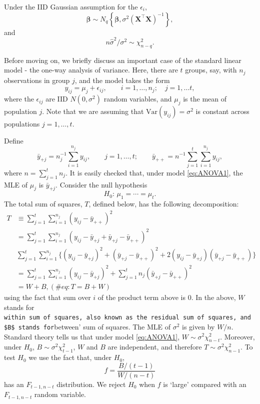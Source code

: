 \documentclass[]{book}
\theoremstyle{definition}
\theoremstyle{definition}
\theoremstyle{definition}
\theoremstyle{remark}
\begin{document}
Under the IID Gaussian assumption for the \(\epsilon_i\),
\[
\hat{\pmb \beta} \sim N_q\left \{{\pmb \beta}, \sigma^2 (\boldsymbol X^\top \boldsymbol X)^{-1}\right\},
\]
and
\[
n\hat{\sigma}^2/\sigma^2 \sim \chi_{n-q}^2.
\]

Before moving on, we briefly discuss an important case of the standard linear model - the one-way analysis of variance.
Here, there are \(t\) groups, say, with \(n_j\) observations in group \(j\), and the model takes the form
\begin{equation}
y_{ij}=\mu_j +\epsilon_{ij}, \qquad i=1, \ldots , n_j; \quad j=1, \ldots t,
\label{eq:ANOVA1}
\end{equation}
where the \(\epsilon_{ij}\) are IID \(N(0,\sigma^2)\) random variables, and \(\mu_j\) is the mean of population \(j\). Note that we are assuming that \(\text{Var}(y_{ij})=\sigma^2\)
is constant across populations \(j=1, \ldots , t\).

Define
\[
\bar{y}_{+j}=n_j^{-1}\sum_{i=1}^{n_j}y_{ij}, \qquad j=1, \ldots , t; \qquad \bar{y}_{++}=n^{-1}\sum_{j=1}^t \sum_{i=1}^{n_j}y_{ij},
\]
where \(n=\sum_{j=1}^t n_j\). It is easily checked that, under model \eqref{eq:ANOVA1}, the MLE of \(\mu_j\) is \(\bar{y}_{+j}\).
Consider the null hypothesis
\[
H_0:\, \mu_1= \cdots = \mu_t.
\]
The total sum of squares, \(T\), defined below,
has the following decomposition:
\begin{align}
T&\equiv \sum_{j=1}^t \sum_{i=1}^{n_j} (y_{ij}-\bar{y}_{++})^2 \nonumber\\
&=\sum_{j=1}^t \sum_{i=1}^{n_j} (y_{ij}-\bar{y}_{+j} + \bar{y}_{+j} -\bar{y}_{++})^2 \nonumber\\
&\sum_{j=1}^t \sum_{i=1}^{n_j} \big \{(y_{ij}-\bar{y}_{+j})^2 + (\bar{y}_{+j} -\bar{y}_{++})^2 + 2 (y_{ij}-\bar{y}_{+j}) (\bar{y}_{+j} -\bar{y}_{++})\big \} \nonumber\\
&=\sum_{j=1}^t \sum_{i=1}^{n_j} (y_{ij}-\bar{y}_{+j})^2 +\sum_{j=1}^t n_j (\bar{y}_{+j}-\bar{y}_{++})^2 \nonumber\\
&=W + B,
(\#eq:T=B+W)
\end{align}
using the fact that sum over \(i\) of the product term above is \(0\). In the above,
\(W\) stands for \texttt{within\textquotesingle{}\ sum\ of\ squares,\ also\ known\ as\ the\ residual\ sum\ of\ squares,\ and\ \$B\$\ stands\ for}between' sum of squares. The MLE of \(\sigma^2\) is given by \(W/n\). Standard theory tells us that under model \eqref{eq:ANOVA1}, \(W \sim \sigma^2 \chi_{n-t}^2\). Moreover, under \(H_0\), \(B \sim \sigma^2 \chi_{t-1}^2\), \(W\) and \(B\) are independent, and therefore \(T \sim \sigma^2 \chi_{n-1}^2\).
To test \(H_0\) we use the fact that, under \(H_0\),
\begin{equation}
f=\frac{B/(t-1)}{W/(n-t)}
\label{eq:Fstat}
\end{equation}
has an \(F_{t-1, n-t}\) distribution. We reject \(H_0\) when \(f\) is `large' compared with an \(F_{t-1,n-t}\) random variable.
\end{document}
